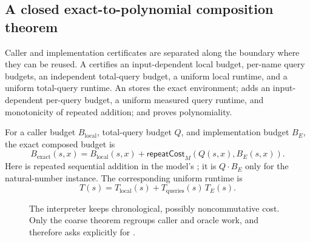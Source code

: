 \subsection{A closed exact-to-polynomial composition theorem}

Caller and implementation certificates are separated along the boundary where
they can be reused.  A  certifies an input-dependent
local budget, per-name query budgets, an independent total-query budget, a
uniform local runtime, and a uniform total-query runtime.  An
 stores the exact environment;
 adds an input-dependent per-query budget, a
uniform measured query runtime, and monotonicity of repeated addition; and
 proves polynomiality.

For a caller budget \(B_{\mathrm{local}}\), total-query budget \(Q\), and
implementation budget \(B_E\), the exact composed budget is
\begin{equation}
  B_{\mathrm{exact}}(s,x)
   = B_{\mathrm{local}}(s,x)
     + \mathsf{repeatCost}_M(Q(s,x),B_E(s,x)).
  \label{eq:oracle-exact}
\end{equation}
Here  is repeated sequential addition in the model's
; it is \(Q\cdot B_E\) only for the natural-number instance.
The corresponding uniform runtime is
\begin{equation}
  T(s)=T_{\mathrm{local}}(s)
    +T_{\mathrm{queries}}(s)\,T_E(s).
  \label{eq:oracle-runtime}
\end{equation}

\begin{figure}[t]
  \centering
  \caption{The interpreter keeps chronological, possibly noncommutative cost.
    Only the coarse theorem regroups caller and oracle work, and therefore asks
    explicitly for .}
  \label{fig:oracle-composition}
\end{figure}

